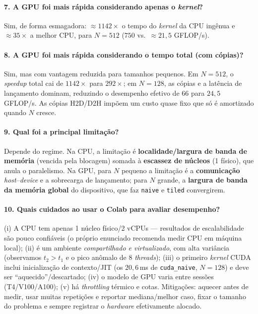 \documentclass{sbc2023}%
\begin{document}
\paragraph{7. A GPU foi mais rápida considerando apenas o \textit{kernel}?}
Sim, de forma esmagadora: $\approx 1142\times$ o tempo do \textit{kernel} da CPU ingênua e $\approx 35\times$ a melhor CPU, para $N=512$ ($750$ vs.\ $\approx 21{,}5$ GFLOP/s).

\paragraph{8. A GPU foi mais rápida considerando o tempo total (com cópias)?}
Sim, mas com vantagem reduzida para tamanhos pequenos. Em $N=512$, o \textit{speedup} total cai de $1142\times$ para $292\times$; em $N=128$, as cópias e a latência de lançamento dominam, reduzindo o desempenho efetivo de $66$ para $24{,}5$ GFLOP/s. As cópias H2D/D2H impõem um custo quase fixo que só é amortizado quando $N$ cresce.

\paragraph{9. Qual foi a principal limitação?}
Depende do regime. Na CPU, a limitação é \textbf{localidade/largura de banda de memória} (vencida pela blocagem) somada à \textbf{escassez de núcleos} (1 físico), que anula o paralelismo. Na GPU, para $N$ pequeno a limitação é a \textbf{comunicação} \textit{host}--\textit{device} e a sobrecarga de lançamento; para $N$ grande, a \textbf{largura de banda da memória global} do dispositivo, que faz \texttt{naive} e \texttt{tiled} convergirem.

\paragraph{10. Quais cuidados ao usar o Colab para avaliar desempenho?}
(i) A CPU tem apenas 1 núcleo físico/2 vCPUs --- resultados de escalabilidade são pouco confiáveis (o próprio enunciado recomenda medir CPU em máquina local); (ii) é um ambiente \emph{compartilhado e virtualizado}, com alta variância (observamos $t_2 > t_1$ e o pico anômalo de 8 \textit{threads}); (iii) o primeiro \textit{kernel} CUDA inclui inicialização de contexto/JIT (os $20{,}6$\,ms de \texttt{cuda\_naive}, $N=128$) e deve ser ``aquecido''/descartado; (iv) o modelo de GPU varia entre sessões (T4/V100/A100); (v) há \textit{throttling} térmico e cotas. Mitigações: aquecer antes de medir, usar muitas repetições e reportar mediana/melhor caso, fixar o tamanho do problema e sempre registrar o \textit{hardware} efetivamente alocado.
\end{document}
